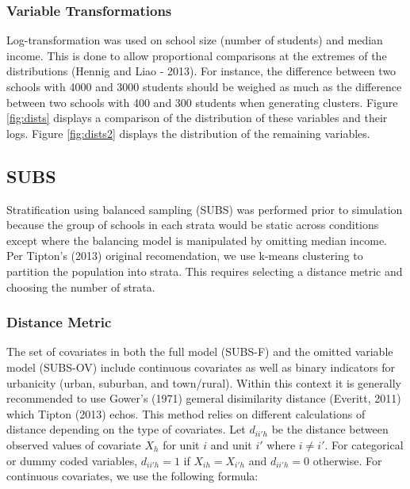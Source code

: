 \documentclass[floatsintext,man]{apa6}
\theoremstyle{definition}
\theoremstyle{definition}
\theoremstyle{definition}
\theoremstyle{remark}
\begin{document}
\subsubsection{Variable Transformations}\label{variable-transformations}

Log-transformation was used on school size (number of students) and
median income. This is done to allow proportional comparisons at the
extremes of the distributions (Hennig and Liao - 2013). For instance,
the difference between two schools with 4000 and 3000 students should be
weighed as much as the difference between two schools with 400 and 300
students when generating clusters. Figure \ref{fig:dists} displays a
comparison of the distribution of these variables and their logs. Figure
\ref{fig:dists2} displays the distribution of the remaining variables.

\subsection{SUBS}\label{subs}

Stratification using balanced sampling (SUBS) was performed prior to
simulation because the group of schools in each strata would be static
across conditions except where the balancing model is manipulated by
omitting median income. Per Tipton's (2013) original recomendation, we
use k-means clustering to partition the population into strata. This
requires selecting a distance metric and choosing the number of strata.

\subsubsection{Distance Metric}\label{distance-metric}

The set of covariates in both the full model (SUBS-F) and the omitted
variable model (SUBS-OV) include continuous covariates as well as binary
indicators for urbanicity (urban, suburban, and town/rural). Within this
context it is generally recommended to use Gower's (1971) gemeral
disimilarity distance (Everitt, 2011) which Tipton (2013) echos. This
method relies on different calculations of distance depending on the
type of covariates. Let \(d_{ii'h}\) be the distance between observed
values of covariate \(X_{h}\) for unit \(i\) and unit \(i'\) where
\(i \ne i'\). For categorical or dummy coded variables, \(d_{ii'h} = 1\)
if \(X_{ih} = X_{i'h}\) and \(d_{ii'h} = 0\) otherwise. For continuous
covariates, we use the following formula:
\end{document}
